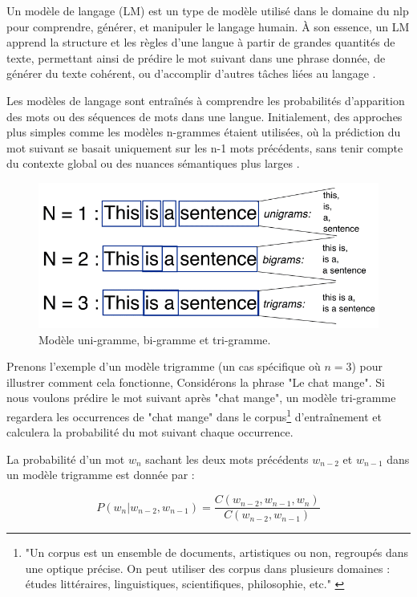 Un modèle de langage (LM) est un type de modèle utilisé dans le domaine du \ac{nlp} pour comprendre, générer, et manipuler le langage humain. À son essence, un LM apprend la structure et les règles d'une langue à partir de grandes quantités de texte, permettant ainsi de prédire le mot suivant dans une phrase donnée, de générer du texte cohérent, ou d'accomplir d'autres tâches liées au langage \cite{Jurafsky2009}. 

Les modèles de langage sont entraînés à comprendre les probabilités d'apparition des mots ou des séquences de mots dans une langue. Initialement, des approches plus simples comme les modèles n-grammes étaient utilisées, où la prédiction du mot suivant se basait uniquement sur les n-1 mots précédents, sans tenir compte du contexte global ou des nuances sémantiques plus larges \cite{Jurafsky2009, Agarwal}.

\begin{figure}[H]
    \centering
    \includegraphics[width=12cm]{gfx/fig-n-gram.png}
    \caption{Modèle uni-gramme, bi-gramme et tri-gramme. \cite{Agarwal}}
    \label{fig:n-gram}
\end{figure}

Prenons l'exemple d'un modèle trigramme (un cas spécifique où $n = 3$) pour illustrer comment cela fonctionne, Considérons la phrase "Le chat mange". Si nous voulons prédire le mot suivant après "chat mange", un modèle tri-gramme regardera les occurrences de "chat mange" dans le corpus\footnote{"Un corpus est un ensemble de documents, artistiques ou non, regroupés dans une optique précise. On peut utiliser des corpus dans plusieurs domaines : études littéraires, linguistiques, scientifiques, philosophie, etc." \cite{frwiki:205358830}} d'entraînement et calculera la probabilité du mot suivant chaque occurrence.

La probabilité d'un mot \(w_n\) sachant les deux mots précédents \(w_{n-2}\) et \(w_{n-1}\) dans un modèle trigramme est donnée par : 

\begin{equation}
    P(w_n | w_{n-2}, w_{n-1}) = \frac{C(w_{n-2}, w_{n-1}, w_n)}{C(w_{n-2}, w_{n-1})}
\end{equation}

